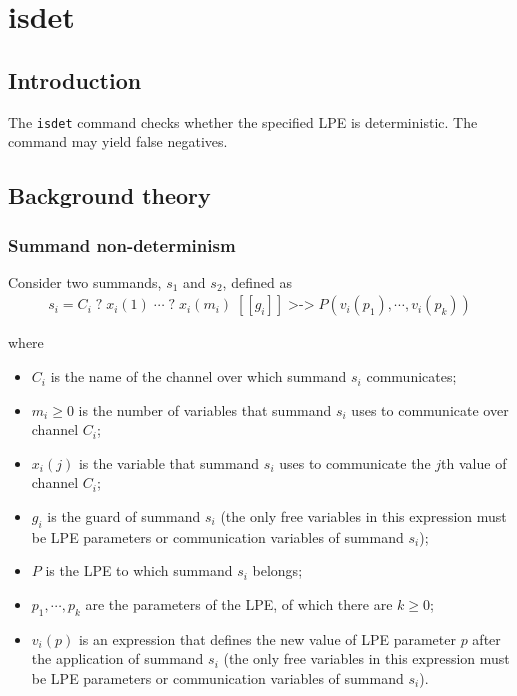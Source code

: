 \chapter{isdet}

\section{Introduction}

The \texttt{isdet} command checks whether the specified LPE is deterministic.
The command may yield false negatives.

\section{Background theory}

\subsection{Summand non-determinism}

Consider two summands, $s_1$ and $s_2$, defined as
\begin{align*}
s_i = C_i \; \texttt{?} \; x_i(1) \; \cdots{} \; \texttt{?} \; x_i(m_i) \; [[g_i]] \; \texttt{>->} \; P(v_i(p_1), \cdots{}, v_i(p_k))
\end{align*}

where

\begin{itemize}
\item $C_i$ is the name of the channel over which summand $s_i$ communicates;
\item $m_i \geq 0$ is the number of variables that summand $s_i$ uses to communicate over channel $C_i$;
\item $x_i(j)$ is the variable that summand $s_i$ uses to communicate the $j$th value of channel $C_i$;
\item $g_i$ is the guard of summand $s_i$ (the only free variables in this expression must be LPE parameters or communication variables of summand $s_i$);
\item $P$ is the LPE to which summand $s_i$ belongs;
\item $p_1, \cdots{}, p_k$ are the parameters of the LPE, of which there are $k \geq 0$;
\item $v_i(p)$ is an expression that defines the new value of LPE parameter $p$ after the application of summand $s_i$ (the only free variables in this expression must be LPE parameters or communication variables of summand $s_i$).
\end{itemize}

